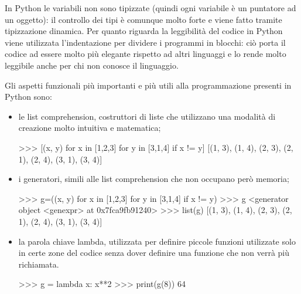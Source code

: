 \documentclass[12pt]{report}
\begin{document}
In Python le variabili non sono tipizzate (quindi ogni variabile è un puntatore ad un oggetto): il controllo dei tipi è comunque molto forte e viene fatto tramite tipizzazione dinamica.
Per quanto riguarda la leggibilità del codice in Python viene utilizzata l'indentazione per dividere i programmi in blocchi: ciò porta il codice ad essere molto più elegante rispetto ad altri linguaggi e lo rende molto leggibile anche per chi non conosce il linguaggio.

Gli aspetti funzionali più importanti e più utili alla programmazione presenti in Python sono:
\begin{itemize}
\item le list comprehension, costruttori di liste che utilizzano una modalità di creazione molto intuitiva e matematica;
\begin{python}[title=Esempio di List Comprehension,frame=single]
>>> [(x, y) for x in [1,2,3] for y in [3,1,4] if x != y]
[(1, 3), (1, 4), (2, 3), (2, 1), (2, 4), (3, 1), (3, 4)]
\end{python}

\vspace{5mm} %
\item i generatori, simili alle list comprehension che non occupano però memoria; %
\begin{python}[title=Esempio di Generatore, frame=single]
>>> g=((x, y) for x in [1,2,3] for y in [3,1,4] if x != y)
>>> g
<generator object <genexpr> at 0x7fca9fb91240>
>>> list(g)
[(1, 3), (1, 4), (2, 3), (2, 1), (2, 4), (3, 1), (3, 4)]
\end{python}

\vspace{5mm} %
\item la parola chiave lambda, utilizzata per definire piccole funzioni utilizzate solo in certe zone del codice senza dover definire una funzione che non verrà più richiamata. %
\begin{python}[title=Esempio di utilizzo della lambda, frame=single]
>>> g = lambda x: x**2
>>> print(g(8))
64
\end{python}


\end{itemize}
\end{document}
